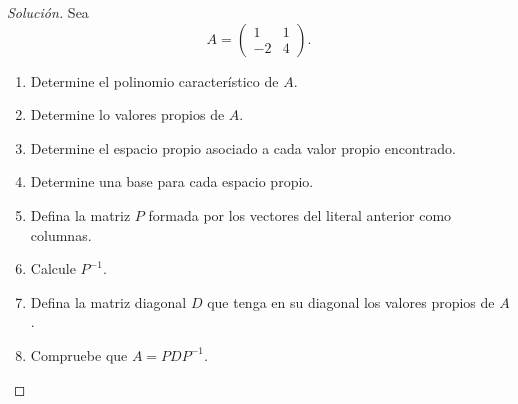 \documentclass[a4,11pt]{aleph-notas}
\begin{document}
\begin{proof}[Solución]\hspace{0pt}
    Sea 
    \[
        A = \begin{pmatrix}
            1 & 1 \\
            -2 & 4
        \end{pmatrix}.
    \]
    \begin{enumerate}
    \item
        Determine el polinomio característico de $A$.
    \item
        Determine lo valores propios de $A$.
    \item
        Determine el espacio propio asociado a cada valor propio encontrado.
    \item
        Determine una base para cada espacio propio.
    \item
        Defina la matriz $P$ formada por los vectores del literal anterior como columnas.
    \item
        Calcule $P^{-1}$.
    \item
        Defina la matriz diagonal $D$ que tenga en su diagonal los valores propios de $A$.
    \item
        Compruebe que $A = P D P^{-1}$.
    \end{enumerate}
\end{proof}
\end{document}
